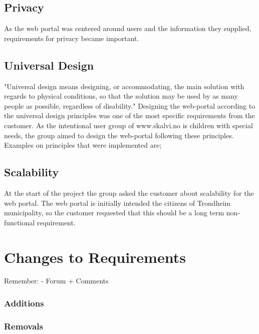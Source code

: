 \subsection{Privacy}
As the web portal was centered around users and the information they supplied, requirements for privacy became important.

\subsection{Universal Design}
\label{universalDesign}
"Universal design means designing, or accommodating, the main solution with regards to physical conditions, so that the solution may be used by as many people as possible, regardless of disability." \cite{Difi} Designing the web-portal according to the universal design principles was one of the most specific requirements from the customer. As the intentional user group of www.skalvi.no is children with special needs, the group aimed to design the web-portal following these principles. Examples on principles that were implemented are;   


\subsection{Scalability}
At the start of the project the group asked the customer about scalability for the web portal. The web portal is initially intended the citizens of Trondheim municipality, so the customer requested that this should be a long term non-functional requirement.


\section{Changes to Requirements}
Remember:
- Forum
+ Comments

\subsubsection{Additions}

\subsubsection{Removals}


\cleardoublepage